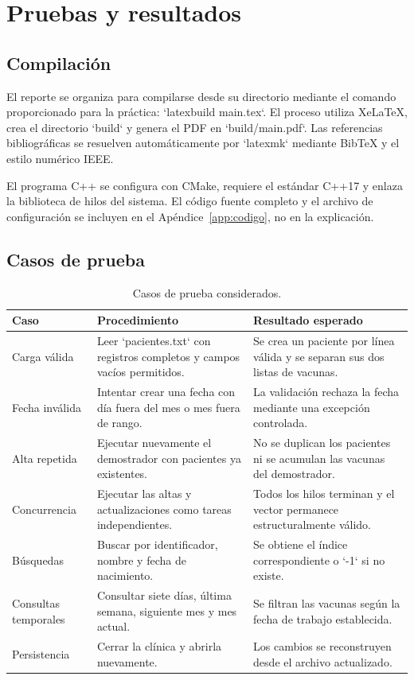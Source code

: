 \documentclass[12pt,letterpaper]{article}
\begin{document}
\section{Pruebas y resultados}

\subsection{Compilación}

El reporte se organiza para compilarse desde su directorio mediante el comando
proporcionado para la práctica: `latexbuild main.tex`. El proceso utiliza
XeLaTeX, crea el directorio `build` y genera el PDF en `build/main.pdf`. Las
referencias bibliográficas se resuelven automáticamente por `latexmk` mediante
BibTeX y el estilo numérico IEEE.

El programa C++ se configura con CMake, requiere el estándar C++17 y enlaza la
biblioteca de hilos del sistema. El código fuente completo y el archivo de
configuración se incluyen en el Apéndice~\ref{app:codigo}, no en la explicación.

\subsection{Casos de prueba}

\begin{table}[H]
\centering
\caption{Casos de prueba considerados.}
\label{tab:pruebas}
\begin{tabularx}{\textwidth}{p{2.7cm}YY}
\toprule
\textbf{Caso} & \textbf{Procedimiento} & \textbf{Resultado esperado} \\
\midrule
Carga válida & Leer `pacientes.txt` con registros completos y campos vacíos permitidos. & Se crea un paciente por línea válida y se separan sus dos listas de vacunas. \\
Fecha inválida & Intentar crear una fecha con día fuera del mes o mes fuera de rango. & La validación rechaza la fecha mediante una excepción controlada. \\
Alta repetida & Ejecutar nuevamente el demostrador con pacientes ya existentes. & No se duplican los pacientes ni se acumulan las vacunas del demostrador. \\
Concurrencia & Ejecutar las altas y actualizaciones como tareas independientes. & Todos los hilos terminan y el vector permanece estructuralmente válido. \\
Búsquedas & Buscar por identificador, nombre y fecha de nacimiento. & Se obtiene el índice correspondiente o `-1` si no existe. \\
Consultas temporales & Consultar siete días, última semana, siguiente mes y mes actual. & Se filtran las vacunas según la fecha de trabajo establecida. \\
Persistencia & Cerrar la clínica y abrirla nuevamente. & Los cambios se reconstruyen desde el archivo actualizado. \\
\bottomrule
\end{tabularx}
\end{table}
\end{document}
